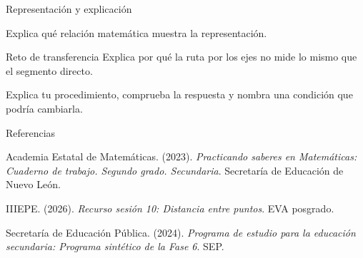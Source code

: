 \documentclass[
	spanish,
	aspectratio=1610,
	xcolor={dvipsnames,table}
]{beamer}
\begin{document}
\begin{frame}{Representación y explicación}
\centering{}\par\vspace{.15cm}\small Explica qué relación matemática muestra la representación.
\end{frame}
\begin{frame}{Reto de transferencia}
\fontsize{14}{18}\selectfont Explica por qué la ruta por los ejes no mide lo mismo que el segmento directo.\par\vspace{.5cm}Explica tu procedimiento, comprueba la respuesta y nombra una condición que podría cambiarla.
\end{frame}
\begin{frame}{Referencias}
\fontsize{9}{11}\selectfont\raggedright 
{\setlength{\parskip}{6pt}
\par\hangindent=1.27cm  Academia Estatal de Matemáticas. (2023). \textit{Practicando saberes en Matemáticas: Cuaderno de trabajo. Segundo grado. Secundaria}. Secretaría de Educación de Nuevo León.
\par\hangindent=1.27cm  IIIEPE. (2026). \textit{Recurso sesión 10: Distancia entre puntos}. EVA posgrado.
\par\hangindent=1.27cm  Secretaría de Educación Pública. (2024). \textit{Programa de estudio para la educación secundaria: Programa sintético de la Fase 6}. SEP.
}


\end{frame}
\end{document}
